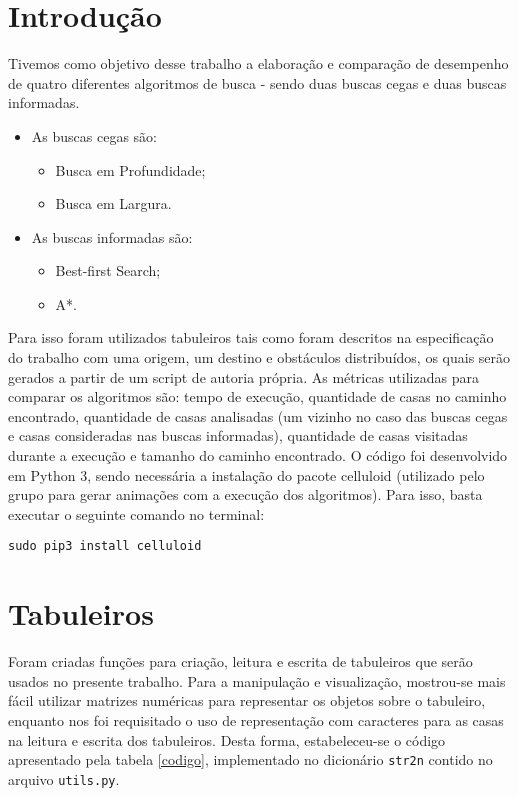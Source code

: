 \documentclass{article}
\begin{document}
\section{Introdução}
Tivemos como objetivo desse trabalho a elaboração e comparação de desempenho de quatro diferentes algoritmos de busca - sendo duas buscas cegas e duas buscas informadas.

\begin{itemize}
	\item As buscas cegas são:
	\begin{itemize}
		\item Busca em Profundidade;
		\item Busca em Largura.
	\end{itemize}
	\item As buscas informadas são:
	\begin{itemize}
		\item Best-first Search;
		\item A*.
	\end{itemize}
\end{itemize}

	Para isso foram utilizados tabuleiros tais como foram descritos na especificação do trabalho com uma origem, um destino e obstáculos distribuídos, os quais serão gerados a partir de um script de autoria própria.
	As métricas utilizadas para comparar os algoritmos são: tempo de execução, quantidade de casas no caminho encontrado, quantidade de casas analisadas (um vizinho no caso das buscas cegas e casas consideradas nas buscas informadas), quantidade de casas visitadas durante a execução e tamanho do caminho encontrado.
	O código foi desenvolvido em Python 3, sendo necessária a instalação do pacote celluloid (utilizado pelo grupo para gerar animações com a execução dos algoritmos). Para isso, basta executar o seguinte comando no terminal:

\begin{verbatim}
sudo pip3 install celluloid
\end{verbatim}

\section{Tabuleiros}
Foram criadas funções para criação, leitura e escrita de tabuleiros que serão usados no presente trabalho. Para a manipulação e visualização, mostrou-se mais fácil utilizar matrizes numéricas para representar os objetos sobre o tabuleiro, enquanto nos foi requisitado o uso de representação com caracteres para as casas na leitura e escrita dos tabuleiros. Desta forma, estabeleceu-se o código apresentado pela tabela \ref{codigo}, implementado no dicionário \verb|str2n| contido no arquivo \verb|utils.py|.
\end{document}
